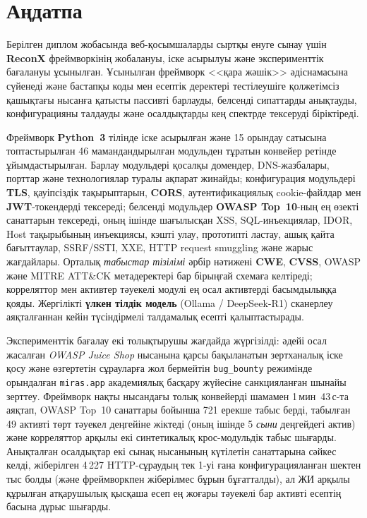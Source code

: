 \chapter*{Аңдатпа}
\begin{SingleSpace}
Берілген диплом жобасында веб-қосымшаларды сыртқы енуге сынау үшін \textbf{ReconX} фреймворкінің жобалануы, іске асырылуы және эксперименттік бағалануы ұсынылған. Ұсынылған фреймворк <<қара жәшік>> әдіснамасына сүйенеді және бастапқы коды мен есептік деректері тестілеушіге қолжетімсіз қашықтағы нысанға қатысты пассивті барлауды, белсенді сипаттарды анықтауды, конфигурацияны талдауды және осалдықтарды кең спектрде тексеруді біріктіреді.

Фреймворк \textbf{Python~3} тілінде іске асырылған және 15 орындау сатысына топтастырылған 46 мамандандырылған модульден тұратын конвейер ретінде ұйымдастырылған. Барлау модульдері қосалқы домендер, DNS-жазбалары, порттар және технологиялар туралы ақпарат жинайды; конфигурация модульдері \textbf{TLS}, қауіпсіздік тақырыптарын, \textbf{CORS}, аутентификациялық cookie-файлдар мен \textbf{JWT}-токендерді тексереді; белсенді модульдер \textbf{OWASP Top~10}-ның ең өзекті санаттарын тексереді, оның ішінде шағылысқан XSS, SQL-инъекциялар, IDOR, Host тақырыбының инъекциясы, кэшті улау, прототипті ластау, ашық қайта бағыттаулар, SSRF/SSTI, XXE, HTTP request smuggling және жарыс жағдайлары. Орталық \textit{табыстар тізілімі} әрбір нәтижені \textbf{CWE}, \textbf{CVSS}, OWASP және MITRE ATT\&CK метадеректері бар бірыңғай схемаға келтіреді; корреляттор мен активтер тәуекелі модулі ең осал активтерді басымдылыққа қояды. Жергілікті \textbf{үлкен тілдік модель} (Ollama / DeepSeek-R1) сканерлеу аяқталғаннан кейін түсіндірмелі талдамалық есепті қалыптастырады.

Эксперименттік бағалау екі толықтырушы жағдайда жүргізілді: әдейі осал жасалған \textit{OWASP Juice Shop} нысанына қарсы бақыланатын зертханалық іске қосу және өзгертетін сұрауларға жол бермейтін \texttt{bug\_bounty} режимінде орындалған \texttt{miras.app} академиялық басқару жүйесіне санкцияланған шынайы зерттеу. Фреймворк нақты нысандағы толық конвейерді шамамен 1\,мин~43\,с-та аяқтап, OWASP Top~10 санаттары бойынша 721 ерекше табыс берді, табылған 49 активті төрт тәуекел деңгейіне жіктеді (оның ішінде 5 \textit{сыни} деңгейдегі актив) және корреляттор арқылы екі синтетикалық крос-модульдік табыс шығарды. Анықталған осалдықтар екі сынақ нысанының күтілетін санаттарына сәйкес келді, жіберілген 4\,227 HTTP-сұраудың тек 1-уі ғана конфигурацияланған шектен тыс болды (және фреймворкпен жіберілмес бұрын бұғатталды), ал ЖИ арқылы құрылған атқарушылық қысқаша есеп ең жоғары тәуекелі бар активті есептің басына дұрыс шығарды.


\end{SingleSpace}
